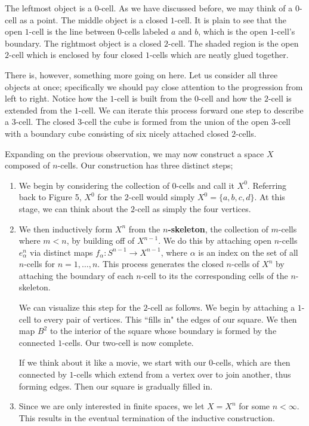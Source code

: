 \documentclass[12pt,oneside]{amsbook}
\begin{document}
The leftmost object is a $0$-cell. As we have discussed before, we may think of a $0$-cell as a point. The middle object is a closed $1$-cell. It is plain to see that the open $1$-cell is the line between $0$-cells labeled $a$ and $b$, which is the open $1$-cell's boundary. The rightmost object is a closed $2$-cell. The shaded region is the open $2$-cell which is enclosed by four closed $1$-cells which are neatly glued together.

There is, however, something more going on here. Let us consider all three objects at once; specifically we should pay close attention to the progression from left to right. Notice how the $1$-cell is built from the $0$-cell and how the $2$-cell is extended from the $1$-cell. We can iterate this process forward one step to describe a $3$-cell. The closed $3$-cell the cube is formed from the union of the open $3$-cell with a boundary cube consisting of six nicely attached closed $2$-cells. 

Expanding on the previous observation, we may now construct a space $X$ composed of $n$-cells. Our construction has three distinct steps;
\begin{enumerate}
\item We begin by considering the collection of $0$-cells and call it $X^0$. Referring back to Figure 5, $X^0$ for the $2$-cell would simply $X^0=\{a,b,c,d\}$. At this stage, we can think about the $2$-cell as simply the four vertices.

\item We then inductively form $X^n$ from the \textbf{$n$-skeleton}, the collection of $m$-cells where $m<n$, by building off of $X^{n-1}$. We do this by attaching open $n$-cells $e^n_\alpha$ via distinct maps $f_\alpha \colon S^{n-1} \rightarrow X^{n-1}$, where $\alpha$ is an index on the set of all $n$-cells for $n=1,\dots,n$. This process generates the closed $n$-cells of $X^n$ by attaching the boundary of each $n$-cell to its the corresponding cells of the $n$-skeleton.

We can visualize this step for the $2$-cell as follows. We begin by attaching a $1$-cell to every pair of vertices. This ``fills in" the edges of our square. We then map $B^2$ to the interior of the square whose boundary is formed by the connected $1$-cells. Our two-cell is now complete.

If we think about it like a movie, we start with our $0$-cells, which are then connected by $1$-cells which extend from a vertex over to join another, thus forming edges. Then our square is gradually filled in.



\item Since we are only interested in finite spaces, we let $X=X^n$ for some $n<\infty$. This results in the eventual termination of the inductive construction.
\end{enumerate}
\end{document}
